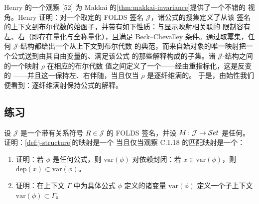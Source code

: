 \begin{remark}\label{rem:henry-observation}
Henry 的一个观察 [52] 为 Makkai 的\cref{thm:makkai-invariance}提供了一个不错的
视角。Henry 证明：对一个取定的 FOLDS 签名 $\mathcal{J}$，诸公式的搜集定义了从该
签名的上下文\trCategory{}到布尔代数的始函子，并带有如下性质：与显示映射相关联的
限制\trHomomorphism{}容有左、右\trAdjunction{}（即存在量化与全称量化），且满足 Beck--Chevalley
条件。通过取幂集，任何 $\mathcal{J}$-结构都给出一个从上下文\trCategory{}到布尔代数
的典范\trFunctor，而来自始对象的唯一映射把一个公式送到由其自由变量的、满足该公式
的那些解释构成的子集。诸 $\mathcal{J}$-结构之间的一个映射 $\rho$ 在相应的布尔代数
值\trFunctor{}之间定义了一个\trNaturalTransformation——经由重指标化，这是反变的
——并且这一\trNaturalTransformation{}保持左、右伴随，当且仅当 $\rho$ 是逐纤维满的。
于是，由始性我们便看到：逐纤维满射保持公式的解释。
\end{remark}

\subsection*{练习}

\begin{exercise}\label{ex:folds-matching-map-mono}
设 $\mathcal{J}$ 是一个带有关系符号 $\dot{R}\in\mathcal{J}$ 的 FOLDS 签名，并设
$M\colon\mathcal{J}\to\mathcal{S}et$ 是任何\trFunctor。证明：\cref{def:j-structure}的映射是一个%
\trMonomorphism{}当且仅当观察 C.1.18 的匹配映射是一个\trMonomorphism：
\begin{center}
\end{center}
\end{exercise}

\begin{exercise}\label{ex:var-subcontext}
\begin{enumerate}[label=(\roman*)]
\item 证明：若 $\phi$ 是任何公式，则 $\mathrm{var}(\phi)$ 对依赖封闭：若
  $x\in\mathrm{var}(\phi)$，则 $\mathrm{dep}(x)\subset\mathrm{var}(\phi)$。
\item 证明：在上下文 $\Gamma$ 中为具体公式 $\phi$ 定义的诸变量 $\mathrm{var}(\phi)$
  定义一个子上下文 $\mathrm{var}(\phi)\subset\Gamma$。
\end{enumerate}
\end{exercise}

